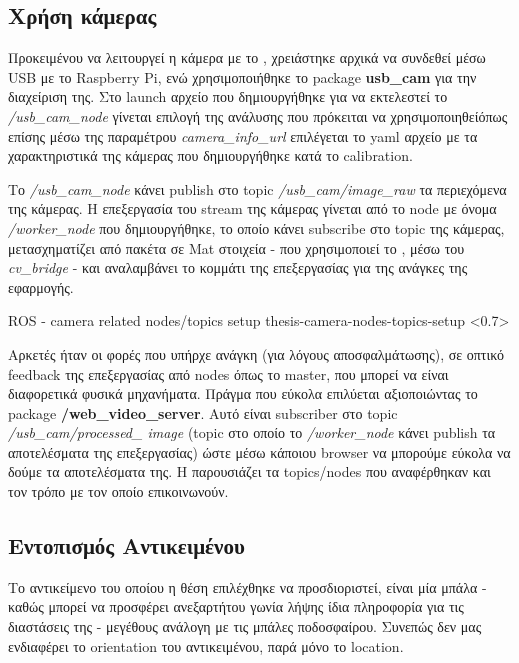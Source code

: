 \subsection{Χρήση κάμερας} \label{sec:camera-usage}
Προκειμένου να λειτουργεί η κάμερα με το , χρειάστηκε αρχικά να συνδεθεί μέσω USB με το Raspberry Pi, ενώ χρησιμοποιήθηκε το package \textbf{usb\_cam} για την διαχείριση της. Στο launch αρχείο που δημιουργήθηκε για να εκτελεστεί το \textit{/usb\_cam\_node} γίνεται επιλογή της ανάλυσης που πρόκειται να χρησιμοποιηθεί\udot όπως επίσης μέσω της παραμέτρου \textit{camera\_info\_url} επιλέγεται το yaml αρχείο με τα χαρακτηριστικά της κάμερας που δημιουργήθηκε κατά το calibration. 

Το \textit{/usb\_cam\_node} κάνει publish στο topic \textit{/usb\_cam/image\_raw} τα περιεχόμενα της κάμερας. Η επεξεργασία του stream της κάμερας γίνεται από το node με όνομα \textit{/worker\_node} που δημιουργήθηκε, το οποίο κάνει subscribe στο topic της κάμερας, μετασχηματίζει από πακέτα  σε Mat στοιχεία - που χρησιμοποιεί το ,  μέσω του \textit{cv\_bridge} - και αναλαμβάνει το κομμάτι της  επεξεργασίας για της ανάγκες της εφαρμογής. 

%
{ROS - camera related nodes/topics setup}%
{thesis-camera-nodes-topics-setup}%
<0.7>

Αρκετές ήταν οι φορές που υπήρχε ανάγκη (για λόγους αποσφαλμάτωσης), σε οπτικό feedback της  επεξεργασίας από nodes όπως το master, που μπορεί να είναι διαφορετικά φυσικά μηχανήματα. Πράγμα που εύκολα επιλύεται αξιοποιώντας το package \textbf{/web\_video\_server}. Αυτό είναι subscriber στο topic \textit{/usb\_\-cam/processed\_ image} (topic στο οποίο το \textit{/worker\_node} κάνει publish τα αποτελέσματα της επεξεργασίας) ώστε μέσω κάποιου browser να μπορούμε εύκολα να δούμε τα αποτελέσματα της. Η  παρουσιάζει τα topics/nodes που αναφέρθηκαν και τον τρόπο με τον οποίο επι\-κοι\-νω\-νούν.

\subsection{Εντοπισμός Αντικειμένου}
Το αντικείμενο του οποίου η θέση επιλέχθηκε να προσδιοριστεί, είναι μία μπάλα - καθώς μπορεί να προσφέρει ανεξαρτήτου γωνία λήψης ίδια πληροφορία για τις διαστάσεις της - μεγέθους ανάλογη με τις μπάλες ποδοσφαίρου. 
Συνεπώς δεν μας ενδιαφέρει το orientation του αντικειμένου, παρά μόνο το location.


